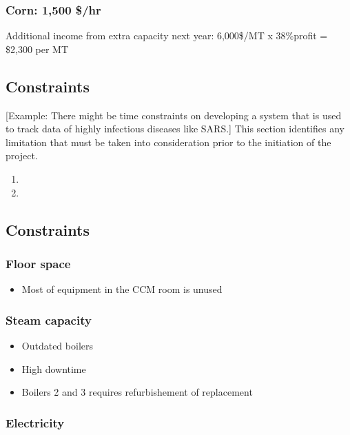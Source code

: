 \documentclass[11pt]{article}
\begin{document}
\subsubsection{Corn:	             1,500 \$/hr}
\label{sec:orgbfd9f0b}
Additional income from extra capacity next year: 
6,000\$/MT x 38\%profit = \$2,300 per MT

\subsection{Constraints}
\label{sec:orgc78aad5}
[Example: There might be time constraints on developing a system that is used to track data of highly infectious diseases like SARS.]
This section identifies any limitation that must be taken into consideration prior to the initiation of the project.
\begin{enumerate}
\item{}
\item{}
\end{enumerate}

\subsection{Constraints}
\label{sec:org5afe00a}
\subsubsection{Floor space}
\label{sec:org920f602}
\begin{itemize}
\item Most of equipment in the CCM room is unused
\end{itemize}
\subsubsection{Steam capacity}
\label{sec:org55e7770}
\begin{itemize}
\item Outdated boilers
\item High downtime
\item Boilers 2 and 3 requires refurbishement of replacement
\end{itemize}
\subsubsection{Electricity}
\label{sec:org76e90b3}
\end{document}
